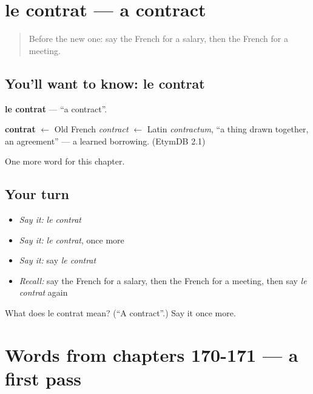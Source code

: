 \section[le contrat]{le contrat — a contract}

\label{lesson:FR-C174-contrat}



\begin{quote}
Before the new one: say the French for a salary, then the French for a meeting.
\end{quote}

\subsection*{You'll want to know: le contrat}
\textbf{le contrat} — \textquotedblleft{}a contract\textquotedblright{}.

\begin{cousinweb}
\textbf{contrat} $\leftarrow$ Old French \emph{contract} $\leftarrow$ Latin \emph{contractum}, \textquotedblleft{}a thing drawn together, an agreement\textquotedblright{} — a learned borrowing. (EtymDB 2.1)
\end{cousinweb}

\begin{grammarlens}[title={What you've built}]
One more word for this chapter.
\end{grammarlens}

\subsection*{Your turn}
\begin{itemize}
\raggedright
  \item \emph{Say it:} \emph{le contrat}
  \item \emph{Say it:} \emph{le contrat}, once more
  \item \emph{Say it:} say \emph{le contrat}
  \item \emph{Recall:} say the French for a salary, then the French for a meeting, then say \emph{le contrat} again
\end{itemize}

\begin{tcolorbox}[breakable,colback=teal!4,colframe=teal!35!black,title={Before you move on}]
What does le contrat mean? (\textquotedblleft{}A contract\textquotedblright{}.) Say it once more.
\end{tcolorbox}
\section[(dialogue)]{Words from chapters 170-171 — a first pass}

